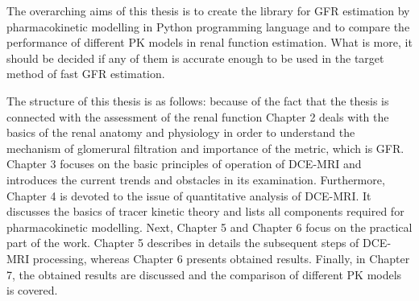 The overarching aims of this thesis is to create the library for GFR estimation by pharmacokinetic modelling in Python programming language and to compare the performance of different PK models in renal function estimation. What is more, it should be decided if any of them is accurate enough to be used in the target method of fast GFR estimation. 

The structure of this thesis is as follows:
because of the fact that the thesis is connected with the assessment of the renal function Chapter 2 deals with the basics of the renal anatomy and physiology in order to understand the mechanism of glomerural filtration and importance of the metric, which is GFR.
Chapter 3 focuses on the basic principles of operation of DCE-MRI and introduces the current trends and obstacles in its examination.  
Furthermore, Chapter 4 is devoted to the issue of quantitative analysis of DCE-MRI. 
It discusses the  basics of tracer kinetic theory and lists all components required for pharmacokinetic modelling.  
Next, Chapter 5 and Chapter 6 focus on the practical part of the work.  
Chapter 5 describes in details the subsequent steps of DCE-MRI processing, whereas Chapter 6 presents obtained results. 
Finally, in Chapter 7, the obtained results are discussed and the comparison of different PK models is covered. 


